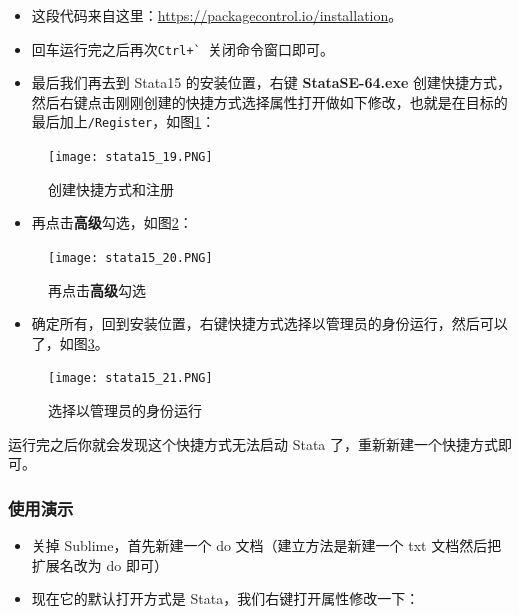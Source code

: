 \documentclass[cn,fancy,blue,11pt]{elegantbook}
\begin{document}
\begin{itemize}
\item
  这段代码来自这里：\url{https://packagecontrol.io/installation}。
\item
  回车运行完之后再次\lstinline{Ctrl+` }关闭命令窗口即可。
\item
  最后我们再去到 Stata15 的安装位置，右键 \textbf{StataSE-64.exe} 创建快捷方式，然后右键点击刚刚创建的快捷方式选择属性打开做如下修改，也就是在目标的最后加上\lstinline{/Register}，如图\ref{fig:stata15_19}：
\end{itemize}

\begin{figure}[htbp]
  \centering
  \texttt{[image: stata15\_19.PNG]}
  \caption{创建快捷方式和注册}
  \label{fig:stata15_19}
\end{figure}

\begin{itemize}
\item
  再点击\textbf{高级}勾选，如图\ref{fig:stata15_20}：
\end{itemize}

\begin{figure}[htbp]
  \centering
  \texttt{[image: stata15\_20.PNG]}
  \caption{再点击\textbf{高级}勾选}
  \label{fig:stata15_20}
\end{figure}

\begin{itemize}
\item
  确定所有，回到安装位置，右键快捷方式选择以管理员的身份运行，然后可以了，如图\ref{fig:stata15_21}。
\end{itemize}

\begin{figure}[htbp]
  \centering
  \texttt{[image: stata15\_21.PNG]}
  \caption{选择以管理员的身份运行}
  \label{fig:stata15_21}
\end{figure}

运行完之后你就会发现这个快捷方式无法启动 Stata 了，重新新建一个快捷方式即可。

\hypertarget{section-9}{%
\subsubsection{使用演示}\label{section-9}}

\begin{itemize}
\item
  关掉 Sublime，首先新建一个 do 文档（建立方法是新建一个 txt 文档然后把扩展名改为 do 即可）
\item
  现在它的默认打开方式是 Stata，我们右键打开属性修改一下：
\end{itemize}
\end{document}
